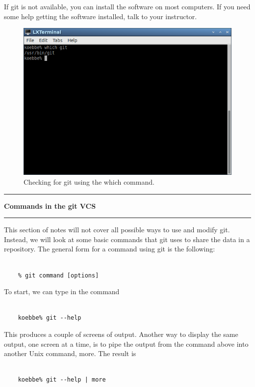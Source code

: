 \documentclass[10pt,fleqn]{article}
\begin{document}
If git is not available, you can install the software on most computers. If you
need some help getting the software installed, talk to your instructor.
\vfill
\begin{figure}[h]
\centering
\includegraphics[width=5.0in]{../images/git_01.png}
\vskip0.1in
\caption{Checking for git using the which command.}
\end{figure}
\eject
\vskip0.1in\hrule\vskip0.1in\noindent
{\bf Commands in the git VCS} 
\vskip0.1in\hrule\vskip0.1in\noindent
This section of notes will not cover all possible ways to use and modify git.
Instead, we will look at some basic commands that git uses to share the data in
a repository. The general form for a command using git is the following:
\begin{verbatim}

    % git command [options]

\end{verbatim}
To start, we can type in the command
\begin{verbatim}

    koebbe% git --help

\end{verbatim}
This produces a couple of screens of output. Another way to display the same
output, one screen at a time, is to pipe the output from the command above into
another Unix command, more. The result is
\begin{verbatim}

    koebbe% git --help | more

\end{verbatim}
\end{document}
